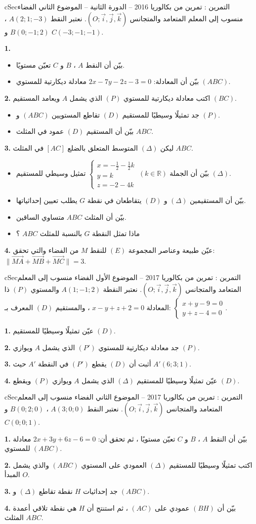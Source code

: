 \documentclass[12pt,a4paper]{article}
\newenvironment{BOX}[2]{\begin{otherlanguage}{english}\begin{arbox}{#1}{#2}}{\end{arbox}\end{otherlanguage}}
\newcounter{exo}
\newenvironment{tamrin}[1]{\stepcounter{exo}\begin{BOX}{cSec}{التمرين \theexo: #1}}{\end{BOX}}
\newcommand{\R}{\mathbb{R}}
\newenvironment{sq}{\begin{itemize}[leftmargin=2.4em,itemsep=3pt]}{\end{itemize}}
\newcommand{\qa}{\item[(أ)]}\newcommand{\qb}{\item[(ب)]}\newcommand{\qc}{\item[(جـ)]}\newcommand{\qd}{\item[(د)]}\newcommand{\qe}{\item[(هـ)]}
\newcommand{\QQ}[1]{\par\smallskip\textbf{#1.} }
\newcommand{\V}[1]{\overrightarrow{#1}}
\newcommand{\Rep}{(O;\vec i,\vec j,\vec k)}
\newcommand{\Sys}[1]{\left\{\begin{array}{l}#1\end{array}\right.}
\begin{document}
\begin{tamrin}{تمرين من بكالوريا 2016 -- الدورة الثانية -- الموضوع الثاني}
الفضاء منسوب إلى المعلم المتعامد والمتجانس $\Rep$. نعتبر النقط $A(2;1;-3)$ ، $B(0;-1;2)$ و $C(-3;-1;-1)$.
\QQ{1}
\begin{sq}
\qa بيّن أن النقط $A$ ، $B$ و $C$ تعيّن مستويًا.
\qb بيّن أن المعادلة: $2x-7y-2z-3=0$ معادلة ديكارتية للمستوي $(ABC)$.
\end{sq}
\QQ{2} اكتب معادلة ديكارتية للمستوي $(P)$ الذي يشمل $A$ ويعامد المستقيم $(BC)$.
\begin{sq}
\qa جد تمثيلًا وسيطيًا للمستقيم $(D)$ تقاطع المستويين $(ABC)$ و $(P)$.
\qb بيّن أن المستقيم $(D)$ عمود في المثلث $ABC$.
\end{sq}
\QQ{3} ليكن $(\Delta)$ المتوسط المتعلق بالضلع $[AC]$ في المثلث $ABC$.
\begin{sq}
\qa بيّن أن الجملة $\Sys{x=-\frac12-\frac12k\\y=k\\z=-2-4k}\ (k\in\R)$ تمثيل وسيطي للمستقيم $(\Delta)$.
\qb بيّن أن المستقيمين $(\Delta)$ و $(D)$ يتقاطعان في نقطة $G$ يطلب تعيين إحداثياتها.
\qc بيّن أن المثلث $ABC$ متساوي الساقين.
\qd ماذا تمثل النقطة $G$ بالنسبة للمثلث $ABC$ ؟
\end{sq}
\QQ{4} عيّن طبيعة وعناصر المجموعة $(E)$ للنقط $M$ من الفضاء والتي تحقق: $\big\|\V{MA}+\V{MB}+\V{MC}\big\|=3$.
\end{tamrin}
\begin{tamrin}{تمرين من بكالوريا 2017 -- الموضوع الأول}
الفضاء منسوب إلى المعلم المتعامد والمتجانس $\Rep$. نعتبر النقطة $A(1;-1;2)$ والمستوي $(P)$ ذا المعادلة $x-y+z+2=0$ ، والمستقيم $(D)$ المعرف بـ: $\Sys{x+y-9=0\\y+z-4=0}$.
\QQ{1} عيّن تمثيلًا وسيطيًا للمستقيم $(D)$.
\QQ{2} جد معادلة ديكارتية للمستوي $(P')$ الذي يشمل $A$ ويوازي $(P)$.
\QQ{3} أثبت أن $(D)$ يقطع $(P')$ في النقطة $A'$ حيث $A'(6;3;1)$.
\QQ{4} عيّن تمثيلًا وسيطيًا للمستقيم $(\Delta)$ الذي يشمل $A$ ويوازي $(P)$ ويقطع $(D)$.
\end{tamrin}
\begin{tamrin}{تمرين من بكالوريا 2017 -- الموضوع الثاني}
الفضاء منسوب إلى المعلم المتعامد والمتجانس $\Rep$. نعتبر النقط $A(3;0;0)$ ، $B(0;2;0)$ و $C(0;0;1)$.
\QQ{1} بيّن أن النقط $A$ ، $B$ و $C$ تعيّن مستويًا ، ثم تحقق أن: $2x+3y+6z-6=0$ معادلة للمستوي $(ABC)$.
\QQ{2} اكتب تمثيلًا وسيطيًا للمستقيم $(\Delta)$ العمودي على المستوي $(ABC)$ والذي يشمل المبدأ $O$.
\QQ{3} جد إحداثيات $H$ نقطة تقاطع $(\Delta)$ و $(ABC)$.
\QQ{4} بيّن أن $(BH)$ عمودي على $(AC)$ ، ثم استنتج أن $H$ هي نقطة تلاقي أعمدة المثلث $ABC$.
\end{tamrin}
\end{document}
